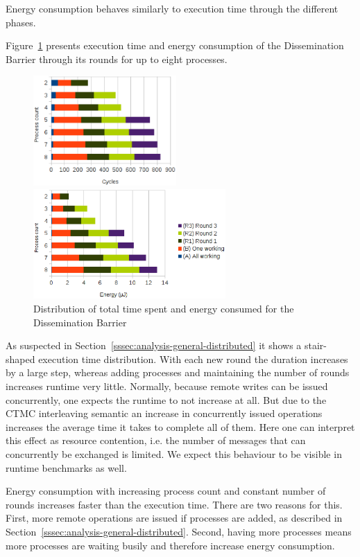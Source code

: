 \documentclass[a4paper, 10pt]{article}
\begin{document}
Energy consumption behaves similarly to execution time through the different phases.

Figure~\ref{fig:d-work-100-partition} presents execution time and energy consumption of the Dissemination Barrier through its rounds for up to eight processes.
\begin{figure}[htbp]
	\centering
	\begin{minipage}{0.43\linewidth}
		\includegraphics[height=4.2cm]{charts/d-time-work-100-partition}
	\end{minipage}
	\begin{minipage}{0.56\linewidth}
		\includegraphics[height=4.2cm]{charts/d-energy-work-100-partition}
	\end{minipage}
	\caption{Distribution of total time spent and energy consumed for the Dissemination Barrier}
	\label{fig:d-work-100-partition}
\end{figure}
As suspected in Section~\ref{sssec:analysis-general-distributed} it shows a stair-shaped execution time distribution. With each new round the duration increases by a large step, whereas adding processes and maintaining the number of rounds increases runtime very little.
Normally, because remote writes can be issued concurrently, one expects the runtime to not increase at all. But due to the CTMC interleaving semantic an increase in concurrently issued operations increases the average time it takes to complete all of them.
Here one can interpret this effect as resource contention, i.e. the number of messages that can concurrently be exchanged is limited. We expect this behaviour to be visible in runtime benchmarks as well.

Energy consumption with increasing process count and constant number of rounds increases faster than the execution time. There are two reasons for this. First, more remote operations are issued if processes are added, as described in Section~\ref{sssec:analysis-general-distributed}. Second, having more processes means more processes are waiting busily and therefore increase energy consumption.
\end{document}
